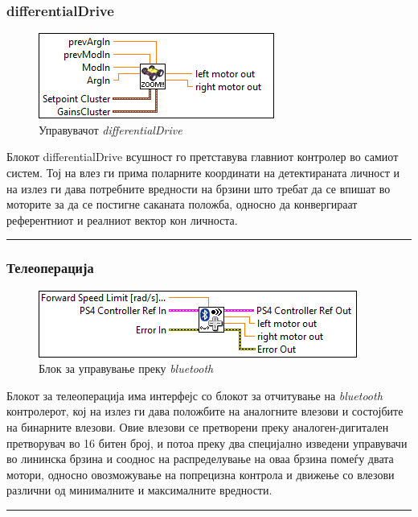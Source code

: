 \documentclass[12pt]{article}
\begin{document}
    \subsubsection{differentialDrive}
	    \begin{figure}[H]
	      \includegraphics[width=0.55\linewidth]{./images/differential_drive_border.png}
		    \caption{Управувачот \textit{differentialDrive}}
	      \label{fig:diffDrive}
	      \raggedright
	      \end{figure}
      Блокот differentialDrive всушност го претставува главниот контролер во самиот систем. Тој на влез ги прима поларните координати на детектираната личност и на излез ги дава потребните вредности на брзини што требат да се впишат во моторите за да се постигне саканата положба, односно да конвергираат референтниот и реалниот вектор кон личноста. %
      \textcolor[RGB]{150,150,150}{\rule{\linewidth}{1.6pt}}

    \subsubsection{Телеоперација}
	    \begin{figure}[H]
	      \includegraphics[width=0.55\linewidth]{./images/teleop_tooltip_border.png}
		    \caption{Блок за управување преку \textit{bluetooth}}
	      \label{fig:teleop}
	      \raggedright
	      \end{figure}
	    Блокот за телеоперација има интерфејс со блокот за отчитување на \textit{bluetooth} контролерот, кој на излез ги дава положбите на аналогните влезови и состојбите на бинарните влезови. Овие влезови се претворени преку аналоген-дигитален претворувач во 16 битен број, и потоа преку два специјално изведени управувачи во лининска брзина и сооднос на распределување на оваа брзина помеѓу двата мотори, односно овозможување на попрецизна контрола и движење со влезови различни од минималните и максималните вредности.
      \textcolor[RGB]{150,150,150}{\rule{\linewidth}{1.6pt}}
\end{document}
